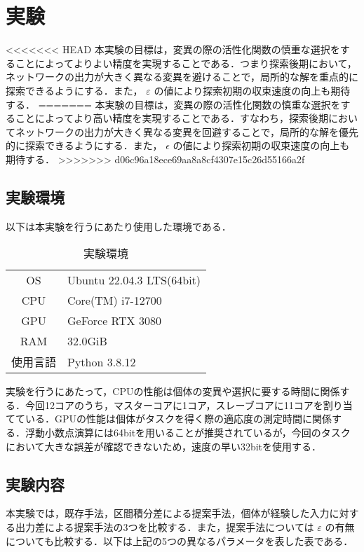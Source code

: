 \section{実験}
<<<<<<< HEAD
本実験の目標は，変異の際の活性化関数の慎重な選択をすることによってよりよい精度を実現することである．つまり探索後期において，ネットワークの出力が大きく異なる変異を避けることで，局所的な解を重点的に探索できるようにする．また， $ \varepsilon $ の値により探索初期の収束速度の向上も期待する．
=======
本実験の目標は，変異の際の活性化関数の慎重な選択をすることによってより高い精度を実現することである．すなわち，探索後期においてネットワークの出力が大きく異なる変異を回避することで，局所的な解を優先的に探索できるようにする．また， $ \epsilon $ の値により探索初期の収束速度の向上も期待する．
>>>>>>> d06c96a18ece69aa8a8cf4307e15c26d55166a2f

\subsection{実験環境}
以下は本実験を行うにあたり使用した環境である．

\begin{table}[h]
    \caption{実験環境}
    \centering
    \begin{tabular}{cl}
        \hline
        OS & Ubuntu 22.04.3 LTS(64bit) \\
        CPU & Core(TM) i7-12700 \\
        GPU & GeForce RTX 3080 \\
        RAM & 32.0GiB \\
        使用言語 & Python 3.8.12 \\
        \hline
    \end{tabular}
\end{table}

実験を行うにあたって，CPUの性能は個体の変異や選択に要する時間に関係する．今回12コアのうち，マスターコアに1コア，スレーブコアに11コアを割り当てている．GPUの性能は個体がタスクを得く際の適応度の測定時間に関係する．浮動小数点演算には64bitを用いることが推奨されているが，今回のタスクにおいて大きな誤差が確認できないため，速度の早い32bitを使用する．

\subsection{実験内容}
本実験では，既存手法，区間積分差による提案手法，個体が経験した入力に対する出力差による提案手法の3つを比較する．また，提案手法については $ \varepsilon $ の有無についても比較する．以下は上記の5つの異なるパラメータを表した表である．

